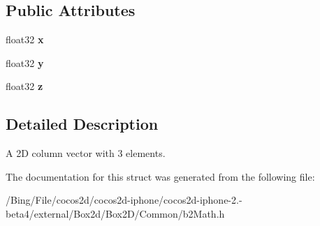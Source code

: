 \subsection*{Public Attributes}
\begin{DoxyCompactItemize}
\item 
\hypertarget{structb2_vec3_aedc5e37849caa413a8e767fc47741db2}{float32 {\bfseries x}}\label{structb2_vec3_aedc5e37849caa413a8e767fc47741db2}

\item 
\hypertarget{structb2_vec3_af5a7e99d13d02ff9abb323838d44d3b1}{float32 {\bfseries y}}\label{structb2_vec3_af5a7e99d13d02ff9abb323838d44d3b1}

\item 
\hypertarget{structb2_vec3_a7cb88968ff10fa500df0b10f5c425536}{float32 {\bfseries z}}\label{structb2_vec3_a7cb88968ff10fa500df0b10f5c425536}

\end{DoxyCompactItemize}


\subsection{Detailed Description}
A 2\-D column vector with 3 elements. 

The documentation for this struct was generated from the following file\-:\begin{DoxyCompactItemize}
\item 
/\-Bing/\-File/cocos2d/cocos2d-\/iphone/cocos2d-\/iphone-\/2.-\/beta4/external/\-Box2d/\-Box2\-D/\-Common/b2\-Math.\-h\end{DoxyCompactItemize}
